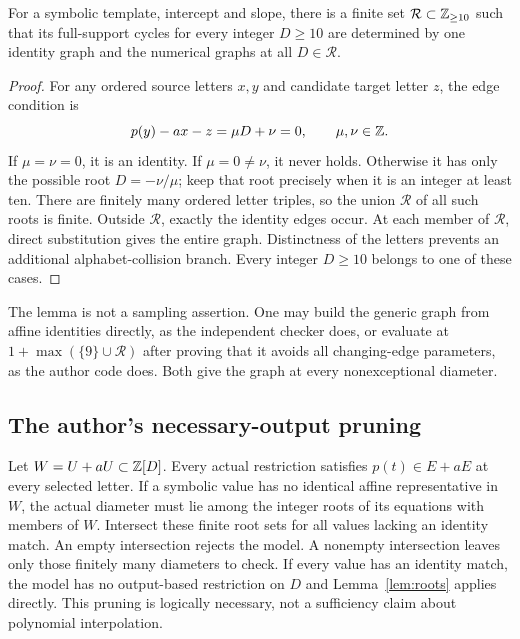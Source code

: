 \begin{lemma}\label{lem:roots}
For a symbolic template, intercept and slope, there is a finite set
$\mathcal R\subset\mathbb Z_{\ge10}$ such that its full-support cycles
for every integer $D\ge10$ are determined by one identity graph
and the numerical graphs at all $D\in\mathcal R$.
\end{lemma}
\begin{proof}
For any ordered source letters $x,y$ and candidate target letter $z$,
the edge condition is
\begin{equation}\label{eq:affineedge}
 p(y)-ax-z=\mu D+\nu=0,\qquad\mu,\nu\in\mathbb Z.
\end{equation}
If $\mu=\nu=0$, it is an identity. If $\mu=0\ne\nu$, it never
holds. Otherwise it has only the possible root $D=-\nu/\mu$;
keep that root precisely when it is an integer at least ten.
There are finitely many ordered letter triples, so the union
$\mathcal R$ of all such roots is finite. Outside $\mathcal R$,
exactly the identity edges occur. At each member of $\mathcal R$,
direct substitution gives the entire graph. Distinctness of the
letters prevents an additional alphabet-collision branch. Every
integer $D\ge10$ belongs to one of these cases.
\end{proof}

The lemma is not a sampling assertion. One may build the generic
graph from affine identities directly, as the independent checker
does, or evaluate at $1+\max(\{9\}\cup\mathcal R)$ after proving
that it avoids all changing-edge parameters, as the author code does.
Both give the graph at every nonexceptional diameter.

\subsection{The author's necessary-output pruning}
Let $W=U+aU\subset\mathbb Z[D]$. Every actual restriction satisfies
$p(t)\in E+aE$ at every selected letter. If a symbolic value has
no identical affine representative in $W$, the actual diameter must
lie among the integer roots of its equations with members of $W$.
Intersect these finite root sets for all values lacking an identity
match. An empty intersection rejects the model. A nonempty
intersection leaves only those finitely many diameters to check.
If every value has an identity match, the model has no output-based
restriction on $D$ and Lemma~\ref{lem:roots} applies directly.
This pruning is logically necessary, not a sufficiency claim about
polynomial interpolation.

